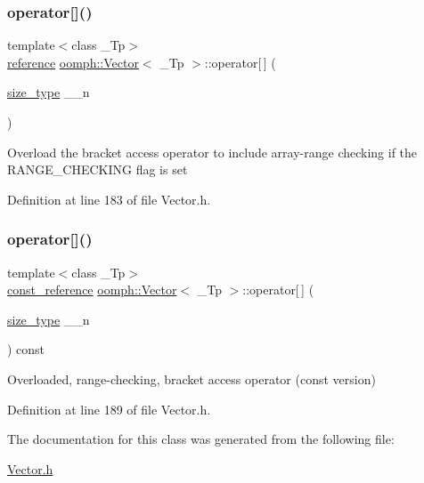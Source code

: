 \subsubsection{\texorpdfstring{operator[]()}{operator[]()}\hspace{0.1cm}{\footnotesize\ttfamily [1/2]}}
{\footnotesize\ttfamily template$<$class \+\_\+\+Tp$>$ \\
\hyperlink{classoomph_1_1Vector_a7bd8c89b884168f3ecc358acc501d356}{reference} \hyperlink{classoomph_1_1Vector}{oomph\+::\+Vector}$<$ \+\_\+\+Tp $>$\+::operator\mbox{[}$\,$\mbox{]} (\begin{DoxyParamCaption}\item[{\hyperlink{classoomph_1_1Vector_a8ad2a43bd51f6bf2a981dd4e4e4247f5}{size\+\_\+type}}]{\+\_\+\+\_\+n }\end{DoxyParamCaption})\hspace{0.3cm}{\ttfamily [inline]}}

Overload the bracket access operator to include array-\/range checking if the R\+A\+N\+G\+E\+\_\+\+C\+H\+E\+C\+K\+I\+NG flag is set 

Definition at line 183 of file Vector.\+h.

\mbox{\label{classoomph_1_1Vector_a94d7a51d16e5792dd770e5a0ad7e7f89}} 
\subsubsection{\texorpdfstring{operator[]()}{operator[]()}\hspace{0.1cm}{\footnotesize\ttfamily [2/2]}}
{\footnotesize\ttfamily template$<$class \+\_\+\+Tp$>$ \\
\hyperlink{classoomph_1_1Vector_ad126afbb3b115ef9dce224cf33c71428}{const\+\_\+reference} \hyperlink{classoomph_1_1Vector}{oomph\+::\+Vector}$<$ \+\_\+\+Tp $>$\+::operator\mbox{[}$\,$\mbox{]} (\begin{DoxyParamCaption}\item[{\hyperlink{classoomph_1_1Vector_a8ad2a43bd51f6bf2a981dd4e4e4247f5}{size\+\_\+type}}]{\+\_\+\+\_\+n }\end{DoxyParamCaption}) const\hspace{0.3cm}{\ttfamily [inline]}}



Overloaded, range-\/checking, bracket access operator (const version) 



Definition at line 189 of file Vector.\+h.



The documentation for this class was generated from the following file\+:\begin{DoxyCompactItemize}
\item 
\hyperlink{Vector_8h}{Vector.\+h}\end{DoxyCompactItemize}
